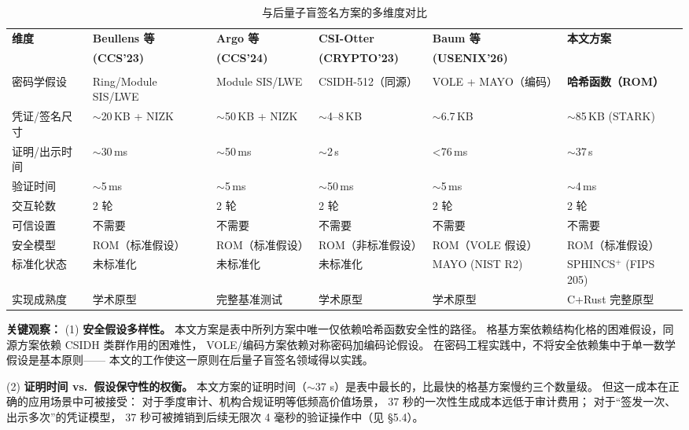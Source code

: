 \documentclass[11pt,a4paper]{ctexart}
\begin{document}
\begin{table}[h]
\centering
\caption{与后量子盲签名方案的多维度对比}
\label{tab:pqblind}
\footnotesize
{}
\begin{tabularx}{\textwidth}{@{}lCCCCC@{}}
\toprule
\textbf{维度} & \textbf{Beullens 等} & \textbf{Argo 等} & \textbf{CSI-Otter} & \textbf{Baum 等} & \textbf{本文方案} \\
 & \textbf{(CCS'23)} & \textbf{(CCS'24)} & \textbf{(CRYPTO'23)} & \textbf{(USENIX'26)} & \\
 & \cite{Beullens2023LatticeBlind} & \cite{Argo2024PracticalPQ} & \cite{Katsumata2023CSI} & \cite{Baum2026ConcretelyEfficientBlind} & \\
\midrule
密码学假设   & Ring/Module SIS/LWE & Module SIS/LWE & CSIDH-512（同源） & VOLE + MAYO（编码） & \textbf{哈希函数（ROM）} \\
凭证/签名尺寸 & $\sim$20\,KB + NIZK & $\sim$50\,KB + NIZK & $\sim$4--8\,KB & $\sim$6.7\,KB & $\sim$85\,KB (STARK) \\
证明/出示时间 & $\sim$30\,ms & $\sim$50\,ms & $\sim$2\,s & {<}76\,ms & $\sim$37\,s \\
验证时间     & $\sim$5\,ms & $\sim$5\,ms & $\sim$50\,ms & $\sim$5\,ms & $\sim$4\,ms \\
交互轮数     & 2 轮 & 2 轮 & 2 轮 & 2 轮 & 2 轮 \\
可信设置     & 不需要 & 不需要 & 不需要 & 不需要 & 不需要 \\
安全模型     & ROM（标准假设） & ROM（标准假设） & ROM（非标准假设） & ROM（VOLE 假设） & ROM（标准假设） \\
标准化状态   & 未标准化 & 未标准化 & 未标准化 & MAYO (NIST R2) & SPHINCS$^+$ (FIPS 205) \\
实现成熟度   & 学术原型 & 完整基准测试 & 学术原型 & 学术原型 & C+Rust 完整原型 \\
\bottomrule
\end{tabularx}
\end{table}

\textbf{关键观察：}
(1) \textbf{安全假设多样性。}
本文方案是表中所列方案中唯一仅依赖哈希函数安全性的路径。
格基方案依赖结构化格的困难假设，同源方案依赖 CSIDH 类群作用的困难性，
VOLE/编码方案依赖对称密码加编码论假设。
在密码工程实践中，不将安全依赖集中于单一数学假设是基本原则——
本文的工作使这一原则在后量子盲签名领域得以实践。

(2) \textbf{证明时间 vs.\ 假设保守性的权衡。}
本文方案的证明时间（$\sim$37 s）是表中最长的，比最快的格基方案慢约三个数量级。
但这一成本在正确的应用场景中可被接受：
对于季度审计、机构合规证明等低频高价值场景，
37 秒的一次性生成成本远低于审计费用；
对于``签发一次、出示多次''的凭证模型，
37 秒可被摊销到后续无限次 4 毫秒的验证操作中（见 §5.4）。
\end{document}
